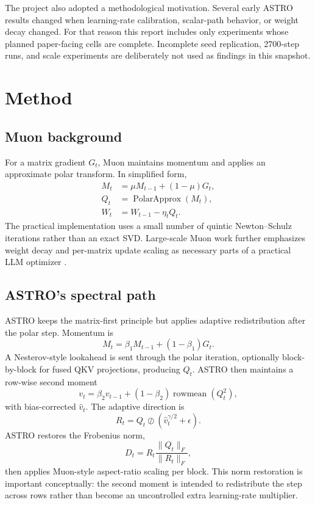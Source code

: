\documentclass[10pt,twocolumn]{article}
\newcommand{\norm}[1]{\lVert #1 \rVert}
\begin{document}
The project also adopted a methodological motivation. Several early ASTRO
results changed when learning-rate calibration, scalar-path behavior, or weight
decay changed. For that reason this report includes only experiments whose
planned paper-facing cells are complete. Incomplete seed replication, 2700-step
runs, and scale experiments are deliberately not used as findings in this
snapshot.

\section{Method}

\subsection{Muon background}

For a matrix gradient $G_t$, Muon maintains momentum and applies an approximate
polar transform. In simplified form,
\begin{align}
M_t &= \mu M_{t-1} + (1-\mu)G_t, \\
Q_t &= \operatorname{PolarApprox}(M_t), \\
W_t &= W_{t-1} - \eta_t Q_t.
\end{align}
The practical implementation uses a small number of quintic Newton--Schulz
iterations rather than an exact SVD. Large-scale Muon work further emphasizes
weight decay and per-matrix update scaling as necessary parts of a practical
LLM optimizer \citep{liu2025scalable}.

\subsection{ASTRO's spectral path}

ASTRO keeps the matrix-first principle but applies adaptive redistribution after
the polar step. Momentum is
\begin{equation}
M_t = \beta_1 M_{t-1} + (1-\beta_1)G_t.
\end{equation}
A Nesterov-style lookahead is sent through the polar iteration, optionally
block-by-block for fused QKV projections, producing $Q_t$. ASTRO then maintains
a row-wise second moment
\begin{equation}
v_t = \beta_2 v_{t-1} + (1-\beta_2)\operatorname{rowmean}(Q_t^2),
\end{equation}
with bias-corrected $\widehat v_t$. The adaptive direction is
\begin{equation}
R_t = Q_t \oslash \left(\widehat v_t^{\gamma/2}+\epsilon\right).
\end{equation}
ASTRO restores the Frobenius norm,
\begin{equation}
D_t = R_t\frac{\norm{Q_t}_F}{\norm{R_t}_F},
\end{equation}
then applies Muon-style aspect-ratio scaling per block. This norm restoration is
important conceptually: the second moment is intended to redistribute the step
across rows rather than become an uncontrolled extra learning-rate multiplier.
\end{document}

